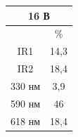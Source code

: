 \documentclass[a4paper,14pt]{extreport}
\begin{document}
\begin{tcolorbox}[colback=red!5,colframe=red!75!black,title=Натрій] 
\tcblower
		\begin{center}
		\begin{tabular}{|c|c|}
		\hline
		\multicolumn{2}{|c|}{16 В}                              \\ \hline
		                             & \%                       \\ \hline
		IR1                          & 14,3                     \\ \hline
		IR2                          & 18,4                      \\ \hline
		330 нм                       & 3,9                     \\ \hline
		590 нм                       & 46                      \\ \hline
		618 нм                       & 18,4                     \\ \hline
		\end{tabular}
	\end{center}
\end{tcolorbox}
\end{document}
